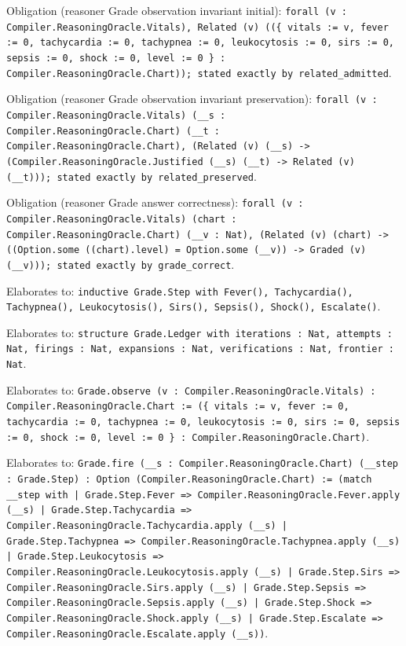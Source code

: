 \documentclass[11pt]{article}
\begin{document}
\noindent Obligation (reasoner Grade observation invariant initial): \texttt{forall (v : Compiler.ReasoningOracle.Vitals), Related (v) ((\{ vitals := v, fever := 0, tachycardia := 0, tachypnea := 0, leukocytosis := 0, sirs := 0, sepsis := 0, shock := 0, level := 0 \} : Compiler.ReasoningOracle.Chart)); stated exactly by related\_admitted}.\par
\noindent Obligation (reasoner Grade observation invariant preservation): \texttt{forall (v : Compiler.ReasoningOracle.Vitals) (\_\_s : Compiler.ReasoningOracle.Chart) (\_\_t : Compiler.ReasoningOracle.Chart), (Related (v) (\_\_s) -> (Compiler.ReasoningOracle.Justified (\_\_s) (\_\_t) -> Related (v) (\_\_t))); stated exactly by related\_preserved}.\par
\noindent Obligation (reasoner Grade answer correctness): \texttt{forall (v : Compiler.ReasoningOracle.Vitals) (chart : Compiler.ReasoningOracle.Chart) (\_\_v : Nat), (Related (v) (chart) -> ((Option.some ((chart).level) = Option.some (\_\_v)) -> Graded (v) (\_\_v))); stated exactly by grade\_correct}.\par
\noindent Elaborates to: \texttt{inductive Grade.Step with Fever(), Tachycardia(), Tachypnea(), Leukocytosis(), Sirs(), Sepsis(), Shock(), Escalate()}.\par
\noindent Elaborates to: \texttt{structure Grade.Ledger with iterations : Nat, attempts : Nat, firings : Nat, expansions : Nat, verifications : Nat, frontier : Nat}.\par
\noindent Elaborates to: \texttt{Grade.observe (v : Compiler.ReasoningOracle.Vitals) : Compiler.ReasoningOracle.Chart := (\{ vitals := v, fever := 0, tachycardia := 0, tachypnea := 0, leukocytosis := 0, sirs := 0, sepsis := 0, shock := 0, level := 0 \} : Compiler.ReasoningOracle.Chart)}.\par
\noindent Elaborates to: \texttt{Grade.fire (\_\_s : Compiler.ReasoningOracle.Chart) (\_\_step : Grade.Step) : Option (Compiler.ReasoningOracle.Chart) := (match \_\_step with | Grade.Step.Fever => Compiler.ReasoningOracle.Fever.apply (\_\_s) | Grade.Step.Tachycardia => Compiler.ReasoningOracle.Tachycardia.apply (\_\_s) | Grade.Step.Tachypnea => Compiler.ReasoningOracle.Tachypnea.apply (\_\_s) | Grade.Step.Leukocytosis => Compiler.ReasoningOracle.Leukocytosis.apply (\_\_s) | Grade.Step.Sirs => Compiler.ReasoningOracle.Sirs.apply (\_\_s) | Grade.Step.Sepsis => Compiler.ReasoningOracle.Sepsis.apply (\_\_s) | Grade.Step.Shock => Compiler.ReasoningOracle.Shock.apply (\_\_s) | Grade.Step.Escalate => Compiler.ReasoningOracle.Escalate.apply (\_\_s))}.\par
\end{document}
